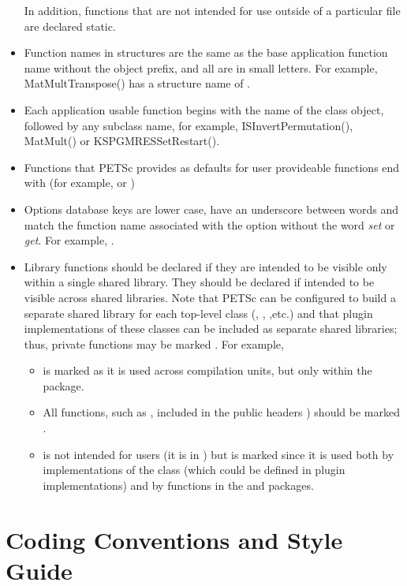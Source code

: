 \documentclass[twoside,12pt]{../sty/report_petsc}
\begin{document}
\begin{itemize}
      In addition, functions that are not intended for use outside
      of a particular file are declared static.
\item Function names in structures are the same as the base application
      function name without the object prefix, and all are in small letters.
      For example, MatMultTranspose() has a structure name of
      .
\item Each application usable function begins with the name of the class object, followed by any subclass name,
      for example, ISInvertPermutation(), MatMult() or KSPGMRESSetRestart().
\item Functions that PETSc provides as defaults for user provideable functions end with  (for example,  or )
\item Options database keys are lower case, have an underscore between words and match the function name associated with the option without the word {\em set} or {\em get}. For example, .
\item Library functions should be declared  if they are intended to be visible only within a single shared library. 
They should be declared  if intended to be visible across shared libraries. 
Note that PETSc can be configured to build a separate shared library for each top-level class (, , ,etc.) and that plugin implementations of these classes can be included as separate shared libraries; thus, private functions may be marked .
For example, 
\begin{itemize}
\item {} is marked  as it is used across compilation units, but only within the  package.
\item All functions, such as , included in the public headers ) should be marked .
\item {} is not intended for users (it is in ) but is marked  since it is used both by implementations of the  class (which could be defined in plugin implementations) and by functions in the  and  packages.
\end{itemize}
\end{itemize}

\section{Coding Conventions and Style Guide}
\end{document}

